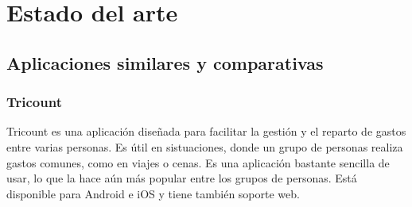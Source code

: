\chapter{Estado del arte}
\label{cap:arte}

\section{Aplicaciones similares y comparativas}
\label{sec:aplicaciones}

\subsection{Tricount}
\label{subsec:tricount}

Tricount es una aplicación diseñada para facilitar la gestión y el reparto de gastos entre varias personas. Es útil en sistuaciones,
donde un grupo de personas realiza gastos comunes, como en viajes o cenas. Es una aplicación bastante sencilla de usar, lo que la 
hace aún más popular entre los grupos de personas. Está disponible para Android e iOS y tiene también soporte web. 

